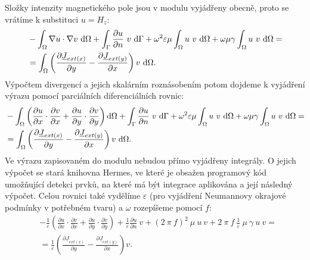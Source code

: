 \documentclass[12pt,a4paper,oneside]{article}
\numberwithin{equation}{section} %
\numberwithin{figure}{section} %
\numberwithin{table}{section} %
\newcommand{\faz}[1]{{\underline{#1}}} %
\begin{document}
Složky intenzity magnetického pole jsou v modulu vyjádřeny obecně, proto se vrátíme k substituci $u = H_z$:
\begin{equation}
\begin{split}
&- \int _{\Omega} \nabla u \cdot \nabla v ~ \ud \Omega + \int _{\Gamma} \frac{\partial u}{\partial n} ~ v ~ \ud \Gamma + \omega ^2 \varepsilon \mu \int _{\Omega} u ~ v ~ \ud \Omega + \omega \mu \gamma \int _{\Omega} u ~ v ~ \ud \Omega = 
\\
&= \int _{\Omega} \left( \frac{\partial \faz{J} _{ext(x)}}{\partial y} - \frac{\partial \faz{J} _{ext(y)}}{\partial x} \right) v ~ \ud \Omega .
\end{split}
\end{equation}
Výpočtem divergencí a jejich skalárním roznásobením potom dojdeme k vyjádření výrazu pomocí parciálních diferenciálních rovnic:
\begin{equation}
\begin{split}
&- \int _{\Omega} \left( \frac{\partial u}{\partial x} \cdot \frac{\partial v}{\partial x} + \frac{\partial u}{\partial y} \cdot \frac{\partial v}{\partial y} \right) \ud \Omega + \int _{\Gamma} \frac{\partial u}{\partial n} ~ v ~ \ud \Gamma + \omega ^2 \varepsilon \mu \int _{\Omega} u ~ v ~ \ud \Omega + \omega \mu \gamma \int _{\Omega} u ~ v ~ \ud \Omega = 
\\
&= \int _{\Omega} \left( \frac{\partial \faz{J} _{ext(x)}}{\partial y} - \frac{\partial \faz{J} _{ext(y)}}{\partial x} \right) v ~ \ud \Omega .
\end{split}
\end{equation}
Ve výrazu zapisovaném do modulu nebudou přímo vyjádřeny integrály. O jejich výpočet se stará knihovna Hermes, ve které je obsažen programový kód umožňující detekci prvků, na které má být integrace aplikována a její následný výpočet. Celou rovnici také vydělíme $\varepsilon$ (pro vyjádření Neumannovy okrajové podmínky v potřebném tvaru) a $\omega$ rozepíšeme pomocí $f$:
\begin{equation}
\label{HzWeakEpsilon}
\begin{split}
&- \frac{1}{\varepsilon} \left( \frac{\partial u}{\partial x} \cdot \frac{\partial v}{\partial x} + \frac{\partial u}{\partial y} \cdot \frac{\partial v}{\partial y} \right) + \frac{1}{\varepsilon} \frac{\partial u}{\partial n} ~ v + (2 ~ \pi ~ f) ^2 ~ \mu ~ u ~ v + 2 ~ \pi ~ f ~ \frac{1}{\varepsilon} ~ \mu ~ \gamma ~ u ~ v =\\
&= \frac{1}{\varepsilon} \left( \frac{\partial \faz{J} _{ext(x)}}{\partial y} - \frac{\partial \faz{J} _{ext(y)}}{\partial x} \right) v .
\end{split}
\end{equation}
\end{document}
